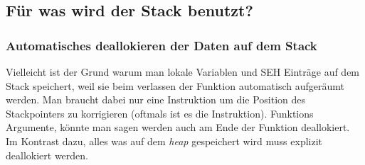 
\subsection{Für was wird der Stack benutzt?}








\subsubsection{Automatisches deallokieren der Daten auf dem Stack}

Vielleicht ist der Grund warum man lokale Variablen und SEH Einträge auf dem Stack speichert, weil sie beim 
verlassen der Funktion automatisch aufgeräumt werden. Man braucht dabei nur eine Instruktion um die Position
des Stackpointers zu korrigieren (oftmals ist es die \ADD Instruktion). Funktions Argumente, könnte man sagen 
werden auch am Ende der Funktion deallokiert. Im Kontrast dazu, alles was auf dem \emph{heap} gespeichert wird muss
explizit deallokiert werden. 





